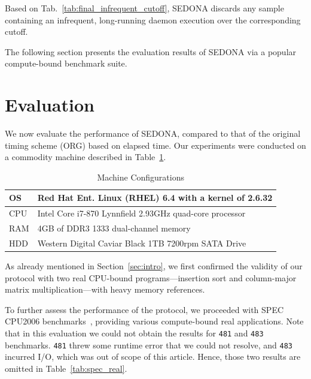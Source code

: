 \documentclass[letter]{ieice}
\begin{document}
Based on Tab.~\ref{tab:final_infrequent_cutoff}, 
SEDONA discards any \hbox{sample} \hbox{containing} an infrequent, long-running daemon execution
over the corresponding cutoff. 

The following section presents the evaluation results of SEDONA via a popular compute-bound benchmark suite.

\section{Evaluation}
\label{sec:eval}
{\color{blue}
We now evaluate the \hbox{performance} of SEDONA, 
compared to that of the original timing scheme (ORG) based on elapsed time.
Our experiments were conducted on a commodity \hbox{machine}
described in Table~\ref{tab:machine_config}. 
\begin{table}[h]
\vspace{-0.2in}
\begin{center}
{%
\begin{tabular}{|l|p{7cm}|}\hline
OS & Red Hat Ent. Linux (RHEL) 6.4 with a kernel of 2.6.32 \\ \hline
CPU & Intel Core i7-870 Lynnfield 2.93GHz quad-core \hbox{processor}\\ \hline
RAM & 4GB of DDR3 1333 dual-channel memory\\ \hline
HDD & Western Digital Caviar Black 1TB 7200rpm SATA Drive\\ \hline
\end{tabular}
}
\end{center}
\caption{Machine Configurations\label{tab:machine_config}}
\vspace{-0.2in}
\end{table}

As already mentioned in Section~\ref{sec:intro}, we first 
confirmed the validity of our protocol with two 
real \hbox{CPU-bound} programs---insertion sort and \hbox{column-major} matrix multiplication---with heavy memory references.

To further assess the performance of the protocol, 
we proceeded with SPEC CPU2006 benchmarks~\cite{specCpu2006}, providing various 
\hbox{compute-bound} real applications.
Note that in this evaluation we could not obtain the results for {\tt 481} and {\tt 483} \hbox{benchmarks}. 
{\tt 481} threw some runtime error that we could not resolve, and {\tt 483} incurred I/O, which was out of scope of this article.
Hence, those two results are omitted in Table~\ref{tab:spec_real}.

}
\end{document}
